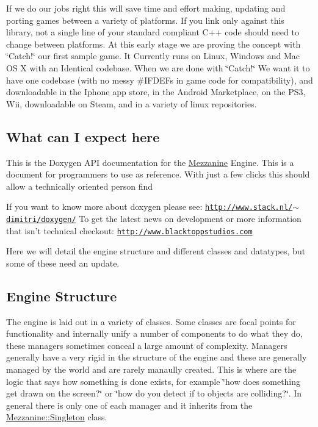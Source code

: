 If we do our jobs right this will save time and effort making, updating and porting games between a variety of platforms. If you link only against this library, not a single line of your standard compliant C++ code should need to change between platforms. At this early stage we are proving the concept with \char`\"{}Catch!\char`\"{} our first sample game. It Currently runs on Linux, Windows and Mac OS X with an Identical codebase. When we are done with \char`\"{}Catch!\char`\"{} We want it to have one codebase (with no messy \#IFDEFs in game code for compatibility), and downloadable in the Iphone app store, in the Android Marketplace, on the PS3, Wii, downloadable on Steam, and in a variety of linux repositories.\hypertarget{index_expectations}{}\subsection{What can I expect here}\label{index_expectations}
This is the Doxygen API documentation for the \hyperlink{namespaceMezzanine}{Mezzanine} Engine. This is a document for programmers to use as reference. With just a few clicks this should allow a technically oriented person find

If you want to know more about doxygen please see: \href{http://www.stack.nl/~dimitri/doxygen/}{\tt http://www.stack.nl/$\sim$dimitri/doxygen/} To get the latest news on development or more information that isn't technical checkout: \href{http://www.blacktoppstudios.com}{\tt http://www.blacktoppstudios.com}

Here we will detail the engine structure and different classes and datatypes, but some of these need an update.\hypertarget{index_enginestructure}{}\subsection{Engine Structure}\label{index_enginestructure}
The engine is laid out in a variety of classes. Some classes are focal points for functionality and internally unify a number of components to do what they do, these managers sometimes conceal a large amount of complexity. Managers generally have a very rigid in the structure of the engine and these are generally managed by the world and are rarely manaully created. This is where are the logic that says how something is done exists, for example \char`\"{}how does something get drawn on the screen?\char`\"{} or \char`\"{}how do you detect if to objects are colliding?\char`\"{}. In general there is only one of each manager and it inherits from the \hyperlink{classMezzanine_1_1Singleton}{Mezzanine::Singleton} class.


